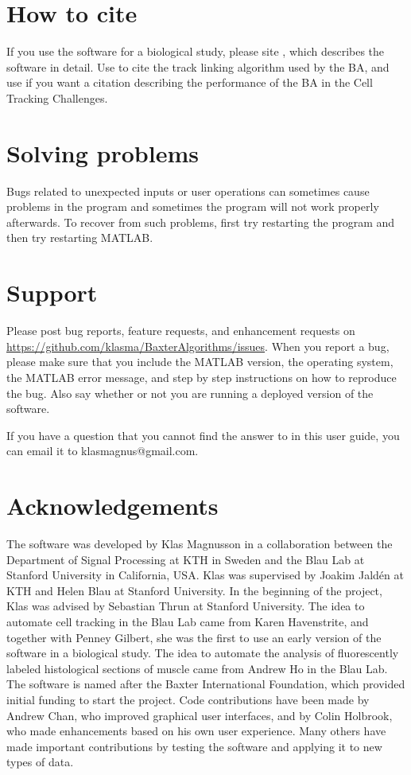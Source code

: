 \documentclass[a4paper, oneside, onecolumn, 11pt]{article}
\begin{document}
\section{How to cite}
If you use the software for a biological study, please site \cite{Magnusson16Thesis}, which describes the software in detail. Use \cite{Magnusson15Viterbi} to cite the track linking algorithm used by the BA, and use \cite{Ulman17Objective} if you want a citation describing the performance of the BA in the Cell Tracking Challenges.

\section{Solving problems}
Bugs related to unexpected inputs or user operations can sometimes cause problems in the program and sometimes the program will not work properly afterwards. To recover from such problems, first try restarting the program and then try restarting MATLAB.

\section{Support}
Please post bug reports, feature requests, and enhancement requests on \url{https://github.com/klasma/BaxterAlgorithms/issues}. When you report a bug, please make sure that you include the MATLAB version, the operating system, the MATLAB error message, and step by step instructions on how to reproduce the bug. Also say whether or not you are running a deployed version of the software.

If you have a question that you cannot find the answer to in this user guide, you can email it to klasmagnus@gmail.com.

\section{Acknowledgements}
The software was developed by Klas Magnusson in a collaboration between the Department of Signal Processing at KTH in Sweden and the Blau Lab at Stanford University in California, USA. Klas was supervised by Joakim Jald\'{e}n at KTH and Helen Blau at Stanford University. In the beginning of the project, Klas was advised by Sebastian Thrun at Stanford University. The idea to automate cell tracking in the Blau Lab came from Karen Havenstrite, and together with Penney Gilbert, she was the first to use an early version of the software in a biological study. The idea to automate the analysis of fluorescently labeled histological sections of muscle came from Andrew Ho in the Blau Lab. The software is named after the Baxter International Foundation, which provided initial funding to start the project. Code contributions have been made by Andrew Chan, who improved graphical user interfaces, and by Colin Holbrook, who made enhancements based on his own user experience. Many others have made important contributions by testing the software and applying it to new types of data.
\end{document}
